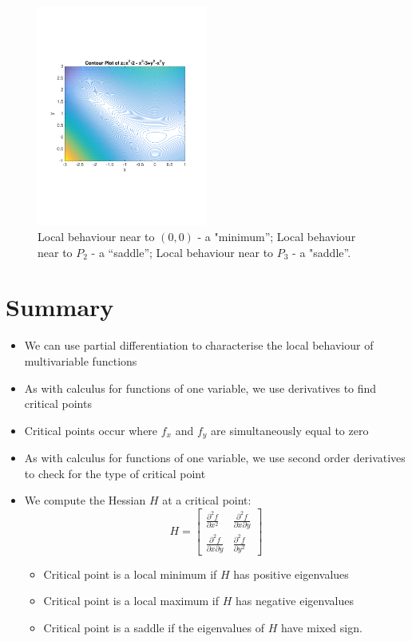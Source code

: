 \documentclass{article}
\begin{document}
\begin{figure}[!ht]
\vspace{-2.5cm}
\centering
\includegraphics[width = 0.5\textwidth]{TaylorP22.pdf}%
\vspace{-3cm}
\caption{Local behaviour near to $(0,0)$ - a "minimum''; 
Local behaviour near to $P_2$ - a ``saddle''; Local behaviour near to $P_3$ - a "saddle''.}
\end{figure}


\section{Summary}

\begin{itemize}
\item
We can use partial differentiation to characterise the local behaviour of multivariable functions
\item
As with calculus for functions of one variable, we use derivatives to find critical points
\item
Critical points occur where $f_x$ and $f_y$ are simultaneously equal to zero
\item
As with calculus for functions of one variable, we use second order derivatives to check for the type of critical point
\item
We compute the Hessian $H$ at a critical point:
$$
H = \left[ \begin{array}{cc}
\frac{\partial ^2 f}{\partial x ^2} & \frac{\partial ^2 f}{\partial x \partial y}\\\frac{\partial ^2 f}{\partial x \partial y} & \frac{\partial ^2 f}{\partial y ^2} \end{array} \right]
$$
\begin{itemize}
\item
Critical point is a local minimum if $H$ has positive eigenvalues
\item
Critical point is a local maximum if $H$ has negative eigenvalues
\item
Critical point is a saddle if the eigenvalues of $H$ have mixed sign.
\end{itemize}
\end{itemize}
\end{document}
